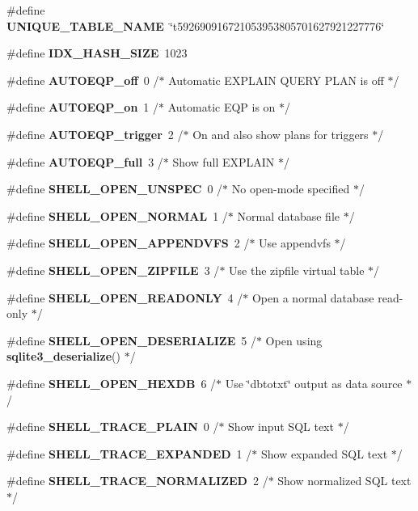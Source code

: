 \begin{DoxyCompactItemize}
\item 
\#define \textbf{ U\+N\+I\+Q\+U\+E\+\_\+\+T\+A\+B\+L\+E\+\_\+\+N\+A\+ME}~\char`\"{}t592690916721053953805701627921227776\char`\"{}
\item 
\#define \textbf{ I\+D\+X\+\_\+\+H\+A\+S\+H\+\_\+\+S\+I\+ZE}~1023
\item 
\#define \textbf{ A\+U\+T\+O\+E\+Q\+P\+\_\+off}~0           /$\ast$ Automatic E\+X\+P\+L\+A\+IN Q\+U\+E\+RY P\+L\+AN is off $\ast$/
\item 
\#define \textbf{ A\+U\+T\+O\+E\+Q\+P\+\_\+on}~1           /$\ast$ Automatic E\+QP is on $\ast$/
\item 
\#define \textbf{ A\+U\+T\+O\+E\+Q\+P\+\_\+trigger}~2           /$\ast$ On and also show plans for triggers $\ast$/
\item 
\#define \textbf{ A\+U\+T\+O\+E\+Q\+P\+\_\+full}~3           /$\ast$ Show full E\+X\+P\+L\+A\+IN $\ast$/
\item 
\#define \textbf{ S\+H\+E\+L\+L\+\_\+\+O\+P\+E\+N\+\_\+\+U\+N\+S\+P\+EC}~0      /$\ast$ No open-\/mode specified $\ast$/
\item 
\#define \textbf{ S\+H\+E\+L\+L\+\_\+\+O\+P\+E\+N\+\_\+\+N\+O\+R\+M\+AL}~1      /$\ast$ Normal database file $\ast$/
\item 
\#define \textbf{ S\+H\+E\+L\+L\+\_\+\+O\+P\+E\+N\+\_\+\+A\+P\+P\+E\+N\+D\+V\+FS}~2      /$\ast$ Use appendvfs $\ast$/
\item 
\#define \textbf{ S\+H\+E\+L\+L\+\_\+\+O\+P\+E\+N\+\_\+\+Z\+I\+P\+F\+I\+LE}~3      /$\ast$ Use the zipfile virtual table $\ast$/
\item 
\#define \textbf{ S\+H\+E\+L\+L\+\_\+\+O\+P\+E\+N\+\_\+\+R\+E\+A\+D\+O\+N\+LY}~4      /$\ast$ Open a normal database read-\/only $\ast$/
\item 
\#define \textbf{ S\+H\+E\+L\+L\+\_\+\+O\+P\+E\+N\+\_\+\+D\+E\+S\+E\+R\+I\+A\+L\+I\+ZE}~5      /$\ast$ Open using \textbf{ sqlite3\+\_\+deserialize}() $\ast$/
\item 
\#define \textbf{ S\+H\+E\+L\+L\+\_\+\+O\+P\+E\+N\+\_\+\+H\+E\+X\+DB}~6      /$\ast$ Use \char`\"{}dbtotxt\char`\"{} output as data source $\ast$/
\item 
\#define \textbf{ S\+H\+E\+L\+L\+\_\+\+T\+R\+A\+C\+E\+\_\+\+P\+L\+A\+IN}~0      /$\ast$ Show input S\+QL text $\ast$/
\item 
\#define \textbf{ S\+H\+E\+L\+L\+\_\+\+T\+R\+A\+C\+E\+\_\+\+E\+X\+P\+A\+N\+D\+ED}~1      /$\ast$ Show expanded S\+QL text $\ast$/
\item 
\#define \textbf{ S\+H\+E\+L\+L\+\_\+\+T\+R\+A\+C\+E\+\_\+\+N\+O\+R\+M\+A\+L\+I\+Z\+ED}~2      /$\ast$ Show normalized S\+QL text $\ast$/

\end{DoxyCompactItemize}
